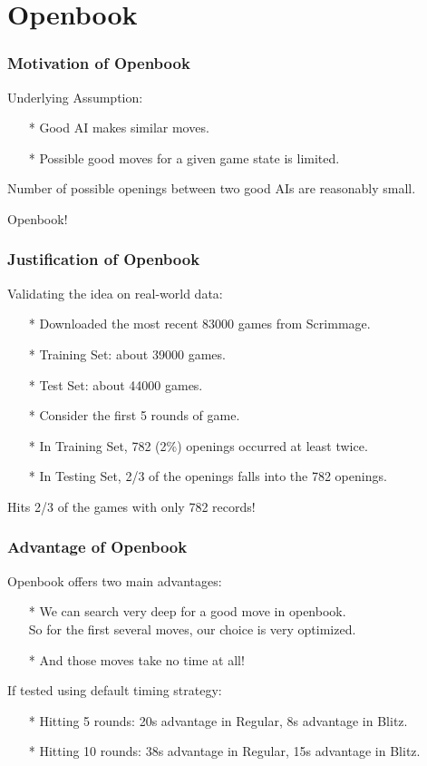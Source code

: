 \documentclass[10pt]{beamer}
\begin{document}
	\section{Openbook}
		\begin{frame}
		\frametitle{Motivation of Openbook}
		Underlying Assumption:
		\begin{itemize}
		\item[*] Good AI makes similar moves.
		\item[*] Possible good moves for a given game state is limited.
		\end{itemize}
		\pause
		Number of possible openings between two good AIs are reasonably small.

		Openbook!
	\end{frame}

	\begin{frame}
		\frametitle{Justification of Openbook}
		Validating the idea on real-world data:\pause
		\begin{itemize}
		\item[*] Downloaded the most recent 83000 games from Scrimmage.
		\item[*] Training Set: about 39000 games.
		\item[*] Test Set: about 44000 games.
		\pause
		\item[*] Consider the first \textcolor{dred}{5} rounds of game.
		\item[*] In Training Set, \textcolor{fgreen}{782 (2\%)} openings occurred at least \textcolor{fgreen}{twice}.
		\item[*] In Testing Set, \textcolor{fgreen}{2/3} of the openings falls into the 782 openings.
		\end{itemize}
		\pause
		Hits \textcolor{fgreen}{2/3} of the games with only \textcolor{fgreen}{782} records!
	\end{frame}

	\begin{frame}
		\frametitle{Advantage of Openbook}
		Openbook offers two main advantages:
		\begin{itemize}
		\item[*] We can search very deep for a good move in openbook.\\
		         So for the first several moves, our choice is very optimized.
		\item[*] And those moves take no time at all!
		\end{itemize}
		\pause
		If tested using default timing strategy:
		\begin{itemize}
		\item[*] Hitting \textcolor{fgreen}{5} rounds: \textcolor{fgreen}{20s} advantage in Regular, \textcolor{fgreen}{8s} advantage in Blitz.
		\item[*] Hitting \textcolor{fgreen}{10} rounds: \textcolor{fgreen}{38s} advantage in Regular, \textcolor{fgreen}{15s} advantage in Blitz.
		\end{itemize}
	\end{frame}
\end{document}
